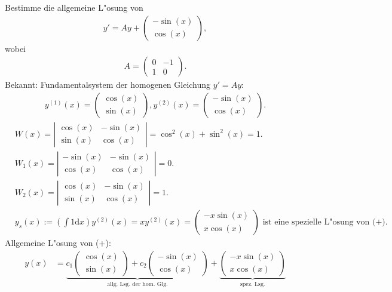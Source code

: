 \documentclass[a4paper,twoside,DIV15,BCOR12mm,chapterprefix=true,headings=twolinechapter]{scrbook}
\begin{document}
\begin{beispiel}
Bestimme die allgemeine L"osung von
\begin{align*}
\tag{+}
y' = Ay + \begin{pmatrix} -\sin(x) \\ \cos(x) \end{pmatrix},
\end{align*}
wobei
\begin{align*}
A = \begin{pmatrix} 0 & -1 \\ 1 & 0 \end{pmatrix}.
\end{align*}
Bekannt: Fundamentalsystem der homogenen Gleichung $y' = Ay$:
\begin{align*}
y^{(1)}(x) = \begin{pmatrix} \cos(x) \\ \sin(x) \end{pmatrix}, y^{(2)}(x) = \begin{pmatrix} -\sin(x) \\ \cos(x) \end{pmatrix}.
\end{align*}
\begin{align*}
&W(x) = \left| \begin{array}{cc} \cos(x) & -\sin(x) \\ \sin(x) & \cos(x) \end{array} \right| = \cos^2(x) + \sin^2(x) = 1. \\
&W_1(x) = \left| \begin{array}{cc} -\sin(x) & -\sin(x) \\ \cos(x) & \cos(x) \end{array} \right| = 0. \\
&W_2(x) = \left| \begin{array}{cc} \cos(x) & -\sin(x) \\ \sin(x) & \cos(x) \end{array} \right| = 1. \\
&y_s(x) := \left( \int 1 \text{d}x \right) y^{(2)}(x) = xy^{(2)}(x) = \begin{pmatrix} -x \sin(x) \\ x \cos(x) \end{pmatrix} \text{ ist eine spezielle L"osung von (+).}
\end{align*}
Allgemeine L"osung von (+):
\begin{align*}
y(x) &= \underbrace{c_1 \begin{pmatrix} \cos(x) \\ \sin(x) \end{pmatrix} + c_2 \begin{pmatrix} -\sin(x) \\ \cos(x) \end{pmatrix}}_{\text{allg. Lsg. der hom. Glg.}} + \underbrace{\begin{pmatrix} -x \sin(x) \\ x \cos(x) \end{pmatrix}}_{\text{spez. Lsg.}} \\

\end{align*}
\end{beispiel}
\end{document}
